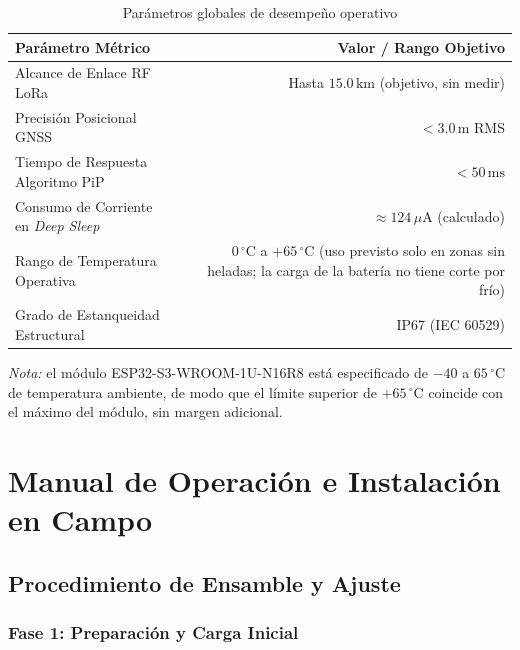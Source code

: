 \begin{table}[H]
\centering
\caption{Parámetros globales de desempeño operativo}
\label{tab:desempeno_sistema}
\vspace{2mm}
\begin{tabularx}{\textwidth}{X r}
\toprule
\rowcolor{categorybg}
\textbf{Parámetro Métrico} & \textbf{Valor / Rango Objetivo} \\
\midrule
Alcance de Enlace RF LoRa & Hasta $15.0\,\text{km}$ (objetivo, sin medir) \\
\rowcolor{rowalt}
Precisión Posicional GNSS & $< 3.0\,\text{m}$ RMS \\
Tiempo de Respuesta Algoritmo PiP & $< 50\,\text{ms}$ \\
\rowcolor{rowalt}
Consumo de Corriente en \textit{Deep Sleep} & $\approx 124\,\mu\text{A}$ (calculado) \\
Rango de Temperatura Operativa & $0\,^\circ\text{C}$ a $+65\,^\circ\text{C}$ (uso previsto solo en zonas sin heladas; la carga de la batería no tiene corte por frío) \\
\rowcolor{rowalt}
Grado de Estanqueidad Estructural & IP67 (IEC 60529) \\
\bottomrule
\end{tabularx}
\end{table}

\noindent\emph{Nota:} el módulo ESP32-S3-WROOM-1U-N16R8 está especificado de $-40$ a $65\,^\circ\text{C}$ de temperatura ambiente, de modo que el límite superior de $+65\,^\circ\text{C}$ coincide con el máximo del módulo, sin margen adicional.

\section{Manual de Operación e Instalación en Campo}

\subsection{Procedimiento de Ensamble y Ajuste}

\subsubsection{Fase 1: Preparación y Carga Inicial}

